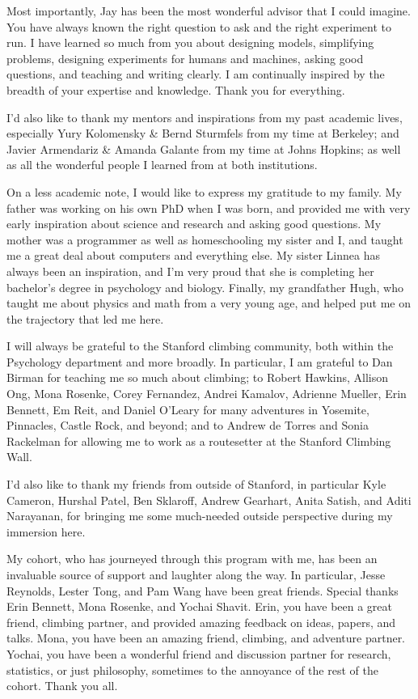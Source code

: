 \documentclass{report}
\begin{document}
Most importantly, Jay has been the most wonderful advisor that I could imagine. You have always known the right question to ask and the right experiment to run. I have learned so much from you about designing models, simplifying problems, designing experiments for humans and machines, asking good questions, and teaching and writing clearly. I am continually inspired by the breadth of your expertise and knowledge. Thank you for everything.

I'd also like to thank my mentors and inspirations from my past academic lives, especially Yury Kolomensky \& Bernd Sturmfels from my time at Berkeley; and Javier Armendariz \& Amanda Galante from my time at Johns Hopkins; as well as all the wonderful people I learned from at both institutions.

On a less academic note, I would like to express my gratitude to my family. My father was working on his own PhD when I was born, and provided me with very early inspiration about science and research and asking good questions. My mother was a programmer as well as homeschooling my sister and I, and taught me a great deal about computers and everything else. My sister Linnea has always been an inspiration, and I'm very proud that she is completing her bachelor's degree in psychology and biology. Finally, my grandfather Hugh, who taught me about physics and math from a very young age, and helped put me on the trajectory that led me here. 

I will always be grateful to the Stanford climbing community, both within the Psychology department and more broadly. In particular, I am grateful to Dan Birman for teaching me so much about climbing; to Robert Hawkins, Allison Ong, Mona Rosenke, Corey Fernandez, Andrei Kamalov, Adrienne Mueller, Erin Bennett, Em Reit, and Daniel O'Leary for many adventures in Yosemite, Pinnacles, Castle Rock, and beyond; and to Andrew de Torres and Sonia Rackelman for allowing me to work as a routesetter at the Stanford Climbing Wall. 

I'd also like to thank my friends from outside of Stanford, in particular Kyle Cameron, Hurshal Patel, Ben Sklaroff, Andrew Gearhart, Anita Satish, and Aditi Narayanan, for bringing me some much-needed outside perspective during my immersion here.

My cohort, who has journeyed through this program with me, has been an invaluable source of support and laughter along the way. In particular, Jesse Reynolds, Lester Tong, and Pam Wang have been great friends. Special thanks Erin Bennett, Mona Rosenke, and Yochai Shavit. Erin, you have been a great friend, climbing partner, and provided amazing feedback on ideas, papers, and talks. Mona, you have been an amazing friend, climbing, and adventure partner. Yochai, you have been a wonderful friend and discussion partner for research, statistics, or just philosophy, sometimes to the annoyance of the rest of the cohort. Thank you all. 
\end{document}
